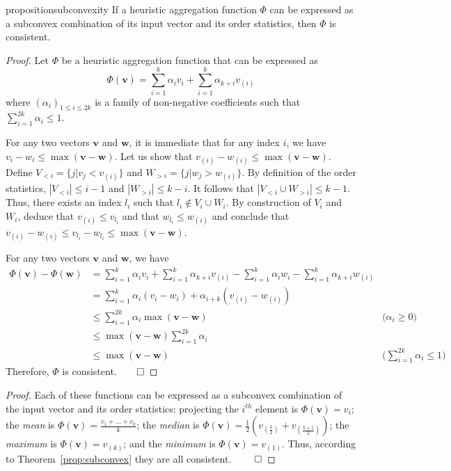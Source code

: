 \documentclass[smallextended]{svjour3}       %
\newcommand{\axiomcons}{consistent\xspace}
\newcommand{\vect}[1]{\mathbf{#1}}
\begin{document}
\begin{restatable}{proposition}{subconvexity}
\label{prop:subconvex}
If a heuristic aggregation function $\Phi$ can be expressed as a subconvex  combination of its input vector and its order statistics, then $\Phi$ is \axiomcons. 
\end{restatable}
\begin{proof}
Let $\Phi$ be a heuristic aggregation function that can be expressed as 
\begin{equation}
    \Phi(\vect{v})=\sum_{i=1}^{k} \alpha_i v_i + \sum_{i=1}^k \alpha_{k+i} v_{(i)}
\end{equation}
where $(\alpha_i)_{1 \leq i \leq 2k}$ is a family of non-negative coefficients such that $\sum_{i=1}^{2k} \alpha_i\leq 1$. 

For any two vectors $\vect{v}$ and $\vect{w}$, it is immediate that for any index $i$, we have $v_i - w_i \leq \max (\vect{v} - \vect{w})$.
Let us show that $v_{(i)} - w_{(i)} \leq \max (\vect{v} - \vect{w})$.
  Define $V_{<i} = \{j| v_j < v_{(i)} \}$ and $W_{>i} = \{j| w_j > w_{(i)} \}$.
  By definition of the order statistics, $|V_{<i}| \leq i - 1$ and $|W_{>i}| \leq k - i$.
  It follows that $|V_{<i} \cup W_{>i}| \leq k - 1$. Thus, there exists an index $l_i$ such that $l_i \notin V_i \cup W_i$.
  By construction of $V_i$ and $W_i$, deduce that $v_{(i)} \leq v_{l_i}$ and that $w_{l_i} \leq w_{(i)}$ and conclude that $v_{(i)} - w_{(i)} \leq v_{l_i} - w_{l_i} \leq \max (\vect{v} - \vect{w})$.
 
For any two vectors $\vect{v}$ and $\vect{w}$, we have
\begin{align}
 \Phi(\vect{v}) - \Phi(\vect{w}) & = \sum_{i=1}^{k} \alpha_i v_i + \sum_{i=1}^k \alpha_{k+i}v_{(i)} -  \sum_{i=1}^{k} \alpha_i w_i - \sum_{i=1}^k \alpha_{k+i} w_{(i)}\\
 & = \sum_{i=1}^{k} \alpha_i (v_i - w_i) + \alpha_{i+k} (v_{(i)} - w_{(i)}) \\
& \leq \sum_{i=1}^{2k} \alpha_i \max(\vect{v} - \vect{w}) & \text{($\alpha_i \geq 0$)}\\
& \leq \max(\vect{v} - \vect{w}) \sum_{i=1}^{2k} \alpha_i \\
& \leq \max(\vect{v} - \vect{w}) & \text{($\sum_{i=1}^{2k} \alpha_i \leq 1$)}
\end{align}
 Therefore, $\Phi$ is \axiomcons.$\qed$
\end{proof}

\minmaxsubconvex*
\begin{proof}
	Each of these functions can be expressed as a subconvex combination of the input vector and its order statistics: 
	projecting the $i^{th}$ element is $\Phi(\vect{v})=v_i$; 
	the \emph{mean} is $\Phi(\vect{v}) = \frac{v_1 + \dots + v_k}{k}$; 
	the \emph{median} is $\Phi(\vect{v}) = \frac{1}{2}(v_{(\frac{k}{2})} + v_{(\frac{k+1}{2})})$; 
	the \emph{maximum} is $\Phi(\vect{v})= v_{(k)}$; 
	and the \emph{minimum} is $\Phi(\vect{v}) = v_{(1)}$. 
	Thus, according to Theorem~\ref{prop:subconvex} they are all \axiomcons. $\qed$
\end{proof}
\end{document}
